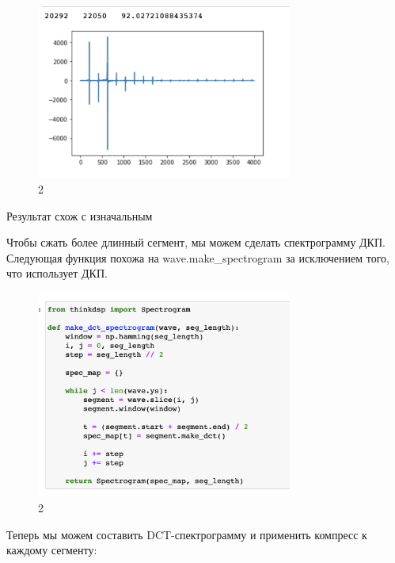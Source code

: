 \documentclass[10pt,a4paper,oneside]{article}
\begin{document}
\begin{figure}[H]
        \centering
        \includegraphics[width=0.75\textwidth]{pics/9.png}
        \caption{2}
        \label{fig:first}
\end{figure}

Результат схож с изначальным

Чтобы сжать более длинный сегмент, мы можем сделать спектрограмму ДКП. Следующая функция похожа на wave.make_spectrogram за исключением того, что использует ДКП.

\begin{figure}[H]
        \centering
        \includegraphics[width=0.75\textwidth]{pics/10.png}
        \caption{2}
        \label{fig:first}
\end{figure}

Теперь мы можем составить DCT-спектрограмму и применить компресс к каждому сегменту:
\end{document}
